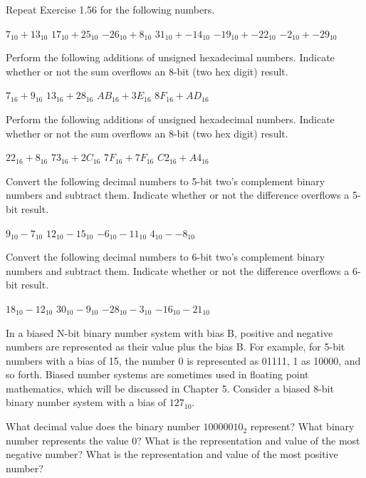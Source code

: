 \exercise %
Repeat Exercise 1.56 for the following numbers.
\begin{tasks}
	\task $7_{10} + 13_{10}$
	\task $17_{10} + 25_{10}$
	\task $-26_{10} + 8_{10}$
	\task $31_{10} + -14_{10}$
	\task $-19_{10} + -22_{10}$
	\task $-2_{10} + -29_{10}$
\end{tasks}

\exercise %
Perform the following additions of unsigned hexadecimal numbers. Indicate whether or not the
sum overflows an 8-bit (two hex digit) result.
\begin{tasks}
	\task $7_{16} + 9_{16}$
	\task $13_{16} + 28_{16}$
	\task $AB_{16} + 3E_{16}$
	\task $8F_{16} + AD_{16}$
\end{tasks}

\exercise %
Perform the following additions of unsigned hexadecimal numbers. Indicate whether or not the
sum overflows an 8-bit (two hex digit) result.
\begin{tasks}
	\task $22_{16} + 8_{16}$
	\task $73_{16} + 2C_{16}$
	\task $7F_{16} + 7F_{16}$
	\task $C2_{16} + A4_{16}$
\end{tasks}

\exercise %
Convert the following decimal numbers to 5-bit two's complement binary numbers and subtract them.
Indicate whether or not the difference overflows a 5-bit result.
\begin{tasks}
	\task $9_{10} - 7_{10}$
	\task $12_{10} - 15_{10}$
	\task $-6_{10} - 11_{10}$
	\task $4_{10} - - 8_{10}$
\end{tasks}

\exercise %
Convert the following decimal numbers to 6-bit two's complement binary numbers and subtract them.
Indicate whether or not the difference overflows a 6-bit result.
\begin{tasks}
	\task $18_{10} - 12_{10}$
	\task $30_{10} - 9_{10}$
	\task $-28_{10} - 3_{10}$
	\task $-16_{10} - 21_{10}$
\end{tasks}

\exercise %
In a biased N-bit binary number system with bias B, positive and negative numbers are represented
as their value plus the bias B. For example, for 5-bit numbers with a bias of 15, the number 0 is
represented as 01111, 1 as 10000, and so forth. Biased number systems are sometimes used in
floating point mathematics, which will be discussed in Chapter 5. Consider a biased 8-bit binary
number system with a bias of $127_10$.
\begin{tasks}
	\task What decimal value does the binary number $10000010_2$ represent?
	\task What binary number represents the value 0?
	\task What is the representation and value of the most negative number?
	\task What is the representation and value of the most positive number?
\end{tasks}

